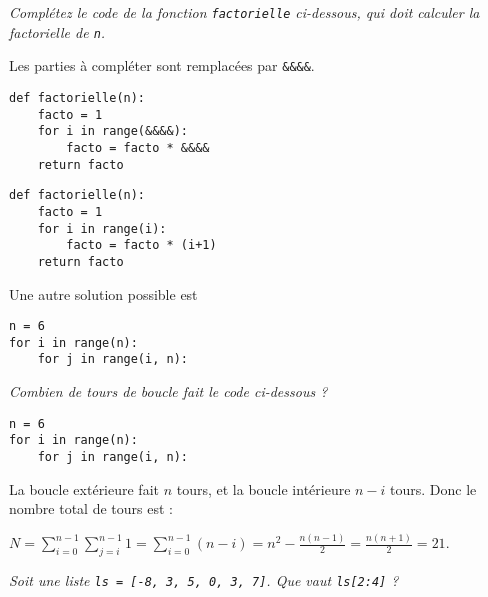 \begin{Exercise}\it
Complétez le code de la fonction \lstinline|factorielle| ci-dessous, qui doit calculer la factorielle de \lstinline|n|. 

Les parties à compléter sont remplacées par \lstinline|&&&&|.

\begin{lstlisting}
def factorielle(n):
    facto = 1
    for i in range(&&&&):
        facto = facto * &&&&
    return facto
\end{lstlisting}
\end{Exercise}
\begin{Answer}
\begin{lstlisting}
def factorielle(n):
    facto = 1
    for i in range(i):
        facto = facto * (i+1)
    return facto
\end{lstlisting}
Une autre solution possible est
\begin{lstlisting}
n = 6
for i in range(n):
    for j in range(i, n):
\end{lstlisting}
\end{Answer}
\begin{Exercise}\it
Combien de tours de boucle fait le code ci-dessous ?

\begin{lstlisting}
n = 6
for i in range(n):
    for j in range(i, n):
\end{lstlisting}
\end{Exercise}
\begin{Answer}La boucle extérieure fait $n$ tours, et la boucle intérieure $n-i$ tours. Donc le nombre total de tours est :
    
$\displaystyle N =\sum_{i=0}^{n-1}\sum_{j=i}^{n-1} 1
    = \sum_{i=0}^{n-1}(n-i) = n^2-\frac{n(n-1)}{2} = \frac{n(n+1)}{2} = 21$.
\end{Answer}
\begin{Exercise}\it
Soit une liste \lstinline|ls = [-8, 3, 5, 0, 3, 7]|. Que vaut \lstinline|ls[2:4]| ?
\end{Exercise}
